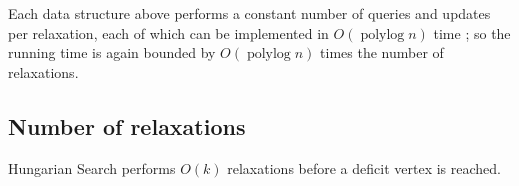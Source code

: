 \documentclass[a4paper,UKenglish]{socg-lipics-v2018}
\def\polylog{\mathop{\mathrm{polylog}}}
\theoremstyle{plain}
\numberwithin{figure}{section}
\begin{document}
Each data structure above performs a constant number of queries and
updates per relaxation, each of which can be implemented in $O(\polylog n)$ time \cite{}; so the running time is again bounded by
$O(\polylog n)$ times the number of relaxations.



\subsection{Number of relaxations}

\begin{lemmarep}
\label{lemma:goldberg_hs_length}
Hungarian Search performs $O(k)$ relaxations before a deficit vertex is reached.
\end{lemmarep}
\end{document}
